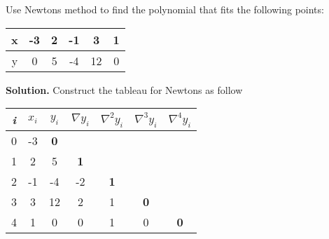 \begin{exercise}{2} %
Use Newton\textquotesingle s method to find the polynomial that fits the following points:\\
\begin{table}[h]
\centering
\begin{tabular}{|c|c|c|c|c|c|}
\hline
x & -3 & 2 & -1 & 3 & 1 \\ \hline
y & 0 & 5 & -4 & 12 & 0 \\ \hline
\end{tabular}
\end{table}

\textbf{Solution.} Construct the tableau for Newton\textquotesingle s as follow

\begin{table}[H]
\centering
\begin{tabular}{|c|c|c|c|c|c|c|}
\hline
\textit{i} & $x_i$ & $y_i$ & $\nabla y_i$ & $\nabla ^2 y_i$ & $\nabla ^3 y_i$ & $\nabla ^4 y_i$ \\ \hline
0 & -3 & \textbf{0} &  &  &  &  \\ \hline
1 & 2 & 5 & \textbf{1} &  &  &  \\ \hline
2 & -1 & -4 & -2 & \textbf{1} &  &  \\ \hline
3 & 3 & 12 & 2 & 1 & \textbf{0} &  \\ \hline
4 & 1 & 0 & 0 & 1 & 0 & \textbf{0} \\ \hline
\end{tabular}
\end{table}


\end{exercise}
